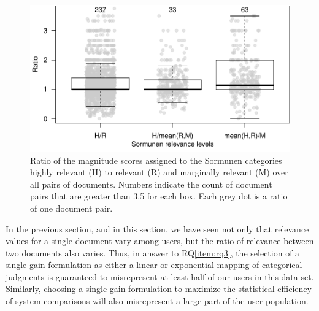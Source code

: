 \begin{figure}[t]
  \centering
  \includegraphics[width=.7\linewidth]{figs/kanoulos_aslam.pdf}
  \caption{Ratio of the magnitude scores assigned to 
    the Sormunen categories highly relevant (H) to relevant (R) and marginally relevant
    (M) over all pairs of documents. Numbers indicate the count of document pairs that 
    are greater than 3.5 for each box. Each grey dot is a ratio of one document pair.
  \label{fig:ka}
    }
\end{figure}


In the previous section, and in this section, we have
seen not only that relevance values for a single document vary among
users, but the ratio of relevance between two documents also varies.
Thus, in answer to RQ\ref{item:rq3}, the selection of a single gain
formulation as either a linear or exponential mapping of categorical
judgments is guaranteed to misrepresent at least half of our users in
this data set.
Similarly, choosing a single gain formulation to maximize the
statistical efficiency of system comparisons will also misrepresent a
large part of the user population.




